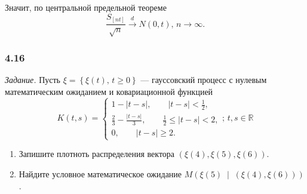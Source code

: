 Значит, по центральной предельной теореме
$$ \frac{S_{ \left[ nt \right] }}{ \sqrt{n}} \overset{d}{ \to } N \left( 0, t \right), \,
  n \to \infty.$$

\subsubsection*{4.16}

\textit{Задание.}
Пусть $ \xi = \left\{ \xi \left( t \right), \, t \geq 0 \right\} $ ---
гауссовский процесс с нулевым математическим ожиданием и ковариационной функцией
$$K \left( t, s \right) =
  \begin{cases}
    1 - \left| t - s \right|, \qquad \left| t - s \right| < \frac{1}{2}, \\
    \frac{2}{3} - \frac{ \left| t - s \right| }{3}, \qquad
    \frac{1}{2} \leq \left| t - s \right| < 2, \\
    0, \qquad \left| t - s \right| \geq 2.
  \end{cases}; \, t, s \in \mathbb{R}$$
\begin{enumerate}[label=\alph*)]
  \item Запишите плотноть распределения вектора
  $ \left( \xi \left( 4 \right), \xi \left( 5 \right), \xi \left( 6 \right) \right) $.
  \item Найдите условное математическое ожидание
  $M \left(
    \xi \left( 5 \right) \; \middle| \; \left( \xi \left( 4 \right), \xi \left( 6 \right) \right)
  \right) $.
\end{enumerate}

